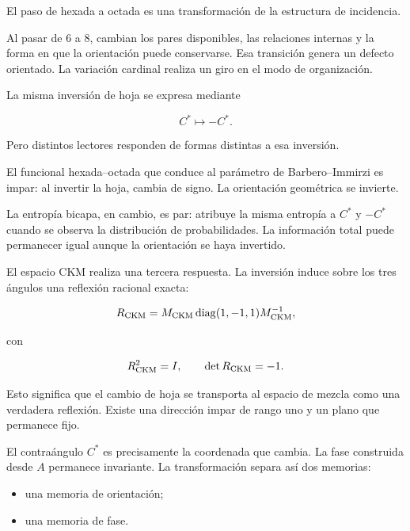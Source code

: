 El paso de hexada a octada es una transformación de la estructura de incidencia.\par

Al pasar de \(6\) a \(8\), cambian los pares disponibles, las relaciones internas y la forma en que la orientación puede conservarse. Esa transición genera un defecto orientado. La variación cardinal realiza un giro en el modo de organización.\par

La misma inversión de hoja se expresa mediante\par

\[
C^*\longmapsto -C^*.
\]

Pero distintos lectores responden de formas distintas a esa inversión.\par

El funcional hexada–octada que conduce al parámetro de Barbero–Immirzi es impar: al invertir la hoja, cambia de signo. La orientación geométrica se invierte.\par

La entropía bicapa, en cambio, es par: atribuye la misma entropía a \(C^*\) y \(-C^*\) cuando se observa la distribución de probabilidades. La información total puede permanecer igual aunque la orientación se haya invertido.\par

El espacio CKM realiza una tercera respuesta. La inversión induce sobre los tres ángulos una reflexión racional exacta:\par

\[
R_{\rm CKM}
=
M_{\rm CKM}
\operatorname{diag}(1,-1,1)
M_{\rm CKM}^{-1},
\]

con\par

\[
R_{\rm CKM}^2=I,
\qquad
\det R_{\rm CKM}=-1.
\]

Esto significa que el cambio de hoja se transporta al espacio de mezcla como una verdadera reflexión. Existe una dirección impar de rango uno y un plano que permanece fijo.\par

El contraángulo \(C^*\) es precisamente la coordenada que cambia. La fase construida desde \(A\) permanece invariante. La transformación separa así dos memorias:\par

\begin{itemize}[leftmargin=*,itemsep=0.35em]
\item una memoria de orientación;
\item una memoria de fase.
\end{itemize}

